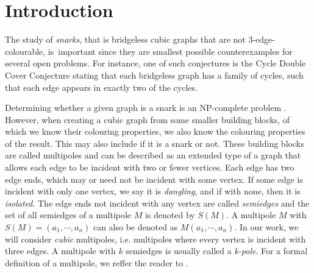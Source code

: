 \section*{Introduction}


The study of \textit{snarks}, that is bridgeless cubic graphs that are not 3-edge-colourable, is~important since they are smallest possible counterexamples for several open problems.
For instance, one of such conjectures is the Cycle Double Cover Conjecture stating that each bridgeless graph has a family of cycles, such that each edge appears in exactly two of the cycles.

Determining whether a given graph is a snark is an NP-complete problem \cite{HolyerNP}. However, when creating a cubic graph from some smaller building blocks, of which we know their colouring properties, we also know the colouring properties of the result. This may also include if it is a snark or not. These building blocks are called multipoles and can be described as an extended type of a graph that allows each edge to be incident with two or fewer vertices. Each edge has two edge ends, which may or need not be incident with some vertex. If some edge is incident with only one vertex, we say it is \textit{dangling}, and if with none, then it is \textit{isolated}. The edge ends not incident with any vertex are called \textit{semiedges} and the set of all semiedges of a multipole $M$ is denoted by $S(M)$.
A multipole $M$ with $S(M) = (a_1, \cdots, a_n)$ can also be denoted as $M(a_1,\cdots,a_n)$.
In our work, we will consider \textit{cubic} multipoles, i.e. multipoles where every vertex is incident with three edges. 
A multipole with $k$ semiedges is usually called a \textit{k-pole}.
For a formal definition of a multipole, we reffer the reader to \cite{TODO}.

